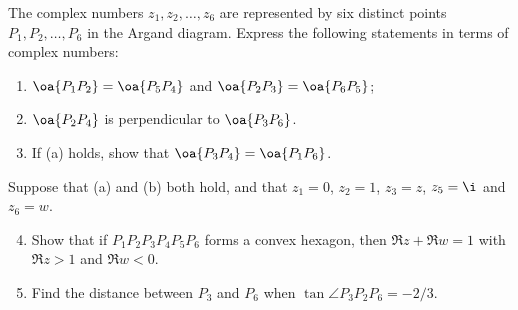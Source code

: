 \begin{problem}
    The complex numbers $z_1, z_2, \dots, z_6$ are represented by six distinct points $P_1, P_2, \dots, P_6$ in the Argand diagram. Express the following statements in terms of complex numbers:
    \begin{enumerate}
        \item $\oa{P_1 P_2} = \oa{P_5 P_4}$ and $\oa{P_2 P_3} = \oa{P_6 P_5}$;
        \item $\oa{P_2 P_4}$ is perpendicular to $\oa{P_3 P_6}$.
        \item If (a) holds, show that $\oa{P_3 P_4} = \oa{P_1 P_6}$.
    \end{enumerate}

    Suppose that (a) and (b) both hold, and that $z_1 = 0$, $z_2 = 1$, $z_3 = z$, $z_5 = \i$ and $z_6 = w$.

    \begin{enumerate}
        \setcounter{enumi}{3}
        \item Show that if $P_1 P_2 P_3 P_4 P_5 P_6$ forms a convex hexagon, then $\Re{z} + \Re{w} = 1$ with $\Re{z} > 1$ and $\Re{w} < 0$.
        \item Find the distance between $P_3$ and $P_6$ when $\tan \angle P_3 P_2 P_6 = -2/3$.
    \end{enumerate}
\end{problem}
